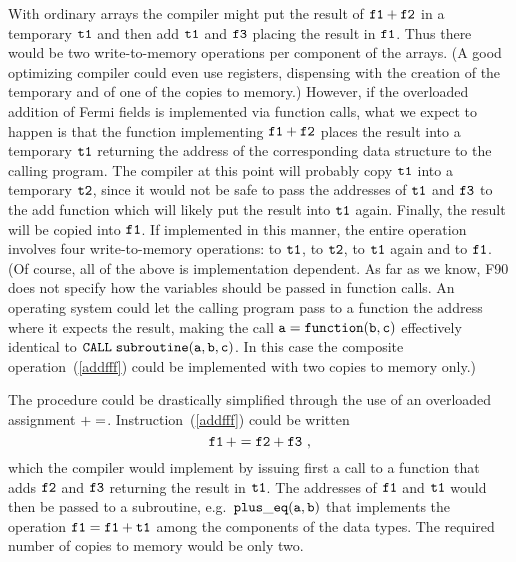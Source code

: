 With ordinary arrays the compiler might put the result of $\tt f1+f2$
in a temporary $\tt t1$ and then add $\tt t1$ and $\tt f3$ placing
the result in $\tt f1$.  Thus there would be two write-to-memory 
operations per
component of the arrays.  (A good optimizing compiler could even use
registers, dispensing with the creation of the temporary and 
of one of the copies to memory.)  However, if the overloaded addition 
of Fermi fields is implemented via function calls, what we expect to
happen is that the function implementing $\tt f1+f2$ places the
result into a temporary $\tt t1$ returning the address of the 
corresponding data structure to the calling program.  The compiler
at this point will probably copy $\tt t1$ into a temporary $\tt t2$, since
it would not be safe to pass the addresses of $\tt t1$ and $\tt f3$
to the add function which will likely put
the result into $\tt t1$ again.  Finally, the result will be copied
into $\tt f1$.  If implemented in this manner, the entire operation
involves four write-to-memory operations: to $\tt t1$, to $\tt t2$,
to $\tt t1$ again and to $\tt f1$. (Of course, all of the above is 
implementation dependent.  As far as we know, F90 does not specify how the 
variables should be passed in function calls.  An operating system could 
let the calling program pass to a function the address where it expects
the result, making the
call $\tt a=function(b,c)$ effectively identical to 
$\tt CALL \; subroutine(a,b,c)$. In this case 
the composite operation~(\ref{addfff})
could be implemented with two copies to memory only.)

The procedure could be drastically simplified through the use of
an overloaded assignment $\tt +=$.  Instruction~(\ref{addfff}) could be
written
%
\begin{equation}
\tt f1\,+=f2+f3 \ ,
\label{pefff}
\end{equation}
%
which the compiler would implement by issuing first a call to a function
that adds $\tt f2$ and $\tt f3$ returning the result in $\tt t1$.  The
addresses of $\tt f1$ and $\tt t1$ would then be passed to a subroutine,
e.g.~$\tt plus\_eq(a,b)$ that implements the operation $\tt f1=f1+t1$
among the components of the data types.  The required number of copies
to memory would be only two.

